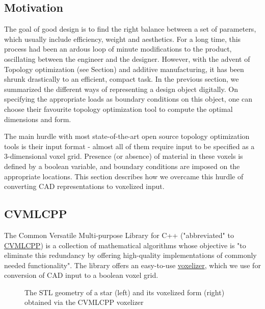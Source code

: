 \subsection{Motivation}
The goal of good design is to find the right balance between a set of parameters, which usually include efficiency, weight and aesthetics. For a long time, this process had been an ardous loop of minute modifications to the product, oscillating between the engineer and the designer. However, with the advent of Topology optimization (see Section) and additive manufacturing, it has been shrunk drastically to an efficient, compact task. In the previous section, we summarized the different ways of representing a design object digitally. On specifying the appropriate loads as boundary conditions on this object, one can choose their favourite topology optimization tool to compute the optimal dimensions and form.


The main hurdle with most state-of-the-art open source topology optimization tools is their input format - almost all of them require input to be specified as a 3-dimensional voxel grid. Presence (or absence) of material in these voxels is defined by a boolean variable, and boundary conditions are imposed on the appropriate locations. This section describes how we overcame this hurdle of converting CAD representations to voxelized input.

\subsection{CVMLCPP}
The Common Versatile Multi-purpose Library for C++ ("abbreviated" to \href{http://tech.unige.ch/cvmlcpp/}{CVMLCPP}) is a collection of mathematical algorithms whose objective is "to eliminate this redundancy by offering high-quality implementations of commonly needed functionality". The library offers an easy-to-use \href{http://tech.unige.ch/cvmlcpp/source/doc/Voxelizer.html}{voxelizer}, which we use for conversion of CAD input to a boolean voxel grid.

\begin{figure}
\centering
\begin{subfigure}{
  \texttt{[image: Pictures/STLToVoxels/Star\_STL.png]}}
\end{subfigure}
\begin{subfigure}{
  \texttt{[image: Pictures/STLToVoxels/Star\_VTK\_Trans.png]}}
\end{subfigure}
\caption{The STL geometry of a star (left) and its voxelized form (right) obtained via the CVMLCPP voxelizer}
\label{fig: voxelizerStar}
\end{figure}

